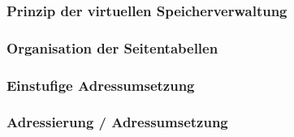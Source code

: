\subsubsection{Prinzip der virtuellen Speicherverwaltung}
\subsubsection{Organisation der Seitentabellen}

\subsubsection{Einstufige Adressumsetzung}

\subsubsection*{Adressierung / Adressumsetzung}
